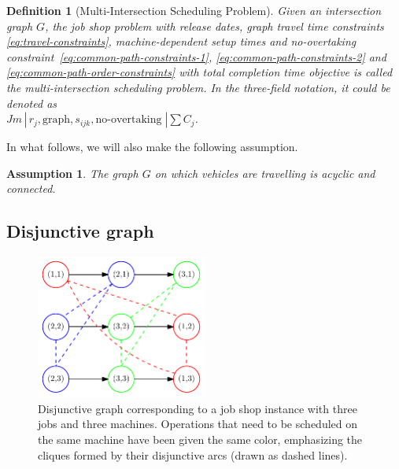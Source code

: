 \documentclass{article}
\theoremstyle{definition}
\theoremstyle{plain}
\newtheorem{define}{Definition}[section]
\newtheorem{assump}{Assumption}[section]
\begin{document}
\begin{define}[Multi-Intersection Scheduling Problem]
  Given an intersection graph $G$, the job shop problem with release dates,
  graph travel time constraints \eqref{eq:travel-constraints}, machine-dependent
  setup times and no-overtaking constraint~\eqref{eq:common-path-constraints-1},
  \eqref{eq:common-path-constraints-2} and
  \eqref{eq:common-path-order-constraints} with total completion time objective
  is called the {\normalfont multi-intersection scheduling problem}. In the
  three-field notation, it could be denoted as \\
  $Jm \, | \, r_{j}, \text{graph}, s_{ijk}, \text{no-overtaking} \; | \sum C_{j}$.
\end{define}

In what follows, we will also make the following assumption.
\begin{assump}
The graph $G$ on which vehicles are travelling is acyclic and connected.
\end{assump}


\newpage

\subsection{Disjunctive graph}

\begin{figure}[t]
  \centering
  \includegraphics[width=0.5\textwidth]{figures/disjunctive-graph.pdf}
  \caption{Disjunctive graph corresponding to a job shop instance with three
    jobs and three machines. Operations that need to be scheduled on the same
    machine have been given the same color, emphasizing the cliques formed by
    their disjunctive arcs (drawn as dashed lines).}
  \label{fig:disjunctive-graph-example}
\end{figure}
\end{document}
